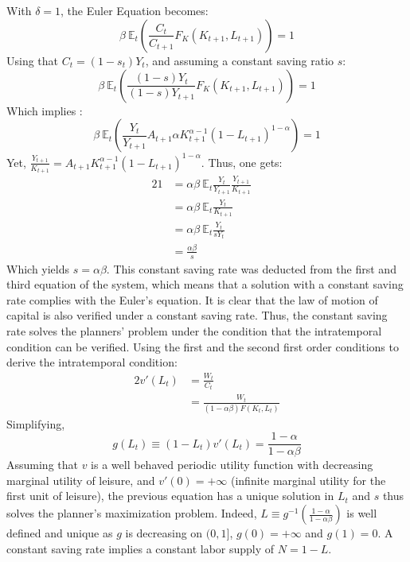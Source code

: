 \documentclass[12pt]{article}
\begin{document}
\subsection{}
With $\delta = 1$, the Euler Equation becomes: 
\begin{equation*}
   \beta~\mathbb{E}_t \left( \frac{C_t}{C_{t+1}} F_K(K_{t+1}, L_{t+1}) \right) = 1
\end{equation*}
Using that $C_t = (1 - s_t) Y_t$, and assuming a constant saving ratio $s$: 
\begin{equation*}
   \beta~\mathbb{E}_t \left( \frac{(1 - s)Y_t}{(1-s)Y_{t+1}}  F_K(K_{t+1}, L_{t+1}) \right) = 1
\end{equation*}
Which implies :
\begin{equation*}
   \beta~\mathbb{E}_t \left( \frac{Y_t}{Y_{t+1}} A_{t+1} \alpha K_{t+1}^{\alpha - 1} (1 - L_{t+1})^{1 - \alpha} \right) = 1
\end{equation*}
Yet, $\displaystyle \frac{Y_{t+1}}{K_{t+1}}= A_{t+1} K_{t+1}^{\alpha-1} (1 - L_{t+1})^{1 - \alpha}$. 
Thus, one gets:
\begin{alignat*}{2}
    1   &= \alpha \beta~\mathbb{E}_t\frac{Y_t}{Y_{t+1}} \frac{Y_{t+1}}{K_{t+1}} \quad\\
        &= \alpha \beta~\mathbb{E}_t \frac{Y_t}{K_{t+1}} \quad\\
        &= \alpha \beta~\mathbb{E}_t \frac{Y_t}{sY_t} \quad\\
        &= \frac{\alpha \beta}{s} \quad
\end{alignat*}
Which yields $s = \alpha \beta$.\newline\newline
This constant saving rate was deducted from the first and third equation of the system, which means that a solution with a constant saving rate complies with the Euler's equation. It is clear that the law of motion of capital is also verified under a constant saving rate. Thus, the constant saving rate solves the planners' problem under the condition that the intratemporal condition can be verified.\newline
Using the first and the second first order conditions to derive the intratemporal condition:
\begin{alignat*}{2}
    v'(L_t) &= \frac{W_t}{C_t} \quad\\
            &= \frac{W_t}{(1-\alpha \beta)F(K_t, L_t)}
\end{alignat*}
Simplifying,
\begin{equation*}
    g(L_t) \equiv (1-L_t)v'(L_t) = \frac{1 - \alpha}{1 - \alpha \beta}
\end{equation*}
Assuming that $v$ is a well behaved periodic utility function with decreasing marginal utility of leisure, and $v'(0)=+\infty$ (infinite marginal utility for the first unit of leisure), the previous equation has a unique solution in $L_t$ and $s$ thus solves the planner's maximization problem. Indeed, $L \equiv g^{-1}\left( \frac{1 - \alpha}{1 - \alpha \beta} \right)$ is well defined and unique as $g$ is decreasing on $(0, 1]$, $g(0) = +\infty$ and $g(1) = 0$.\newline
A constant saving rate implies a constant labor supply of $N = 1 - L$.
\end{document}
